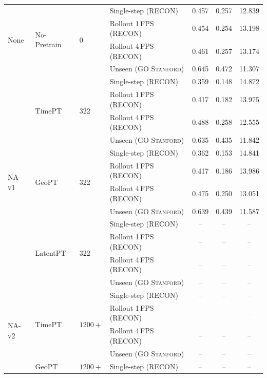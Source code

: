 \documentclass{article}
\newcommand{\TBD}{\textcolor{gray}{--}}
\newcommand{\NAvOne}{\textsc{NA-v1}}
\newcommand{\NAvTwo}{\textsc{NA-v2}}
\newcommand{\UnseenData}{\textsc{GO Stanford}}
\begin{document}
\begin{table}[t]
\begin{threeparttable}
\begin{tabular}{lll lccc}
      \midrule
      \multirow{4}{*}{None}
      & \multirow{4}{*}{No-Pretrain} & \multirow{4}{*}{0}
      & Single-step (RECON) & 0.457 & 0.257 & 12.839 \\
      & & & Rollout 1\,FPS (RECON) & 0.454 & 0.254 & 13.198 \\
      & & & Rollout 4\,FPS (RECON) & 0.461 & 0.257 & 13.174 \\
      & & & Unseen (\UnseenData{}) & 0.645 & 0.472 & 11.307 \\
      \midrule
      \multirow{12}{*}{\NAvOne{}}
      & \multirow{4}{*}{TimePT} & \multirow{4}{*}{322}
      & Single-step (RECON) & 0.359 & 0.148 & 14.872 \\
      & & & Rollout 1\,FPS (RECON) & 0.417 & 0.182 & 13.975 \\
      & & & Rollout 4\,FPS (RECON) & 0.488 & 0.258 & 12.555 \\
      & & & Unseen (\UnseenData{}) & 0.635 & 0.435 & 11.842 \\
      \addlinespace[2pt]
      & \multirow{4}{*}{GeoPT} & \multirow{4}{*}{322}
      & Single-step (RECON) & 0.362 & 0.153 & 14.841 \\
      & & & Rollout 1\,FPS (RECON) & 0.417 & 0.186 & 13.986 \\
      & & & Rollout 4\,FPS (RECON) & 0.475 & 0.250 & 13.051 \\
      & & & Unseen (\UnseenData{}) & 0.639 & 0.439 & 11.587 \\
      \addlinespace[2pt]
      & \multirow{4}{*}{LatentPT} & \multirow{4}{*}{322}
      & Single-step (RECON) & \TBD & \TBD & \TBD \\
      & & & Rollout 1\,FPS (RECON) & \TBD & \TBD & \TBD \\
      & & & Rollout 4\,FPS (RECON) & \TBD & \TBD & \TBD \\
      & & & Unseen (\UnseenData{}) & \TBD & \TBD & \TBD \\
      \midrule
      \multirow{12}{*}{\NAvTwo{}}
      & \multirow{4}{*}{TimePT} & \multirow{4}{*}{$1200{+}$}
      & Single-step (RECON) & \TBD & \TBD & \TBD \\
      & & & Rollout 1\,FPS (RECON) & \TBD & \TBD & \TBD \\
      & & & Rollout 4\,FPS (RECON) & \TBD & \TBD & \TBD \\
      & & & Unseen (\UnseenData{}) & \TBD & \TBD & \TBD \\
      \addlinespace[2pt]
      & \multirow{4}{*}{GeoPT} & \multirow{4}{*}{$1200{+}$}
      & Single-step (RECON) & \TBD & \TBD & \TBD \\

\end{tabular}
\end{threeparttable}
\end{table}
\end{document}
